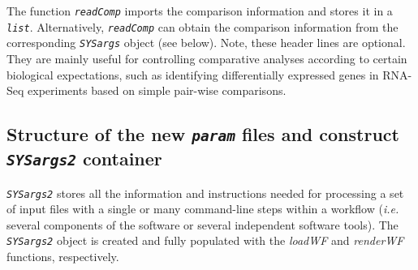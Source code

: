 \documentclass[14pt,]{article}
\newcommand{\hlstr}[1]{\textcolor[rgb]{0.251,0.627,0.251}{#1}}%
\newcommand{\hlcom}[1]{\textcolor[rgb]{0.502,0.502,0.502}{\textit{#1}}}%
\newcommand{\hlstd}[1]{\textcolor[rgb]{0.251,0.251,0.251}{#1}}%
\newcommand{\hlkwc}[1]{\textcolor[rgb]{0.251,0.251,0.251}{#1}}%
\newcommand{\hlkwd}[1]{\textcolor[rgb]{0.878,0.439,0.125}{#1}}%
\newenvironment{Shaded}{\begin{myshaded}}{\end{myshaded}}
\newcommand{\KeywordTok}[1]{\hlkwd{#1}}
\newcommand{\DataTypeTok}[1]{\hlkwc{#1}}
\newcommand{\StringTok}[1]{\hlstr{#1}}
\newcommand{\CommentTok}[1]{\hlcom{#1}}
\newcommand{\NormalTok}[1]{\hlstd{#1}}
\begin{document}
The function \emph{\texttt{readComp}} imports the comparison information and stores it in a
\emph{\texttt{list}}. Alternatively, \emph{\texttt{readComp}} can obtain the comparison information from
the corresponding \emph{\texttt{SYSargs}} object (see below). Note, these header lines are
optional. They are mainly useful for controlling comparative analyses according
to certain biological expectations, such as identifying differentially expressed
genes in RNA-Seq experiments based on simple pair-wise comparisons.

\begin{Shaded}
\end{Shaded}

\hypertarget{structure-of-the-new-param-files-and-construct-sysargs2-container}{%
\subsection{\texorpdfstring{Structure of the new \emph{\texttt{param}} files and construct \emph{\texttt{SYSargs2}} container}{Structure of the new param files and construct SYSargs2 container}}\label{structure-of-the-new-param-files-and-construct-sysargs2-container}}

\emph{\texttt{SYSargs2}} stores all the information and instructions needed for processing
a set of input files with a single or many command-line steps within a workflow
(\emph{i.e.} several components of the software or several independent software tools).
The \emph{\texttt{SYSargs2}} object is created and fully populated with the \emph{loadWF}
and \emph{renderWF} functions, respectively.
\end{document}
